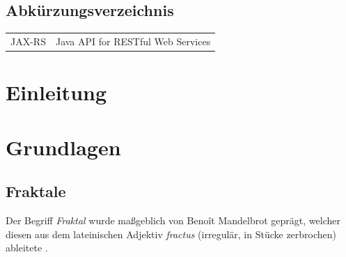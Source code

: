 \documentclass[a4paper,12pt,onesided]{report}
\begin{document}
\newpage
\listoffigures
{}

\newpage
\lstlistoflistings
{}

\newpage
\section*{Abkürzungsverzeichnis}
\begin{tabular}{ll}
  JAX-RS&Java API for RESTful Web Services\\
\end{tabular}

\newpage
\chapter{Einleitung}

\chapter{Grundlagen}
\section{Fraktale}
Der Begriff \textit{Fraktal} wurde maßgeblich von Benoît Mandelbrot geprägt, welcher diesen aus dem lateinischen Adjektiv
\textit{fractus} (irregulär, in Stücke zerbrochen) ableitete \cite{mandelbrot2013fraktale}. 



{}

\end{document}
